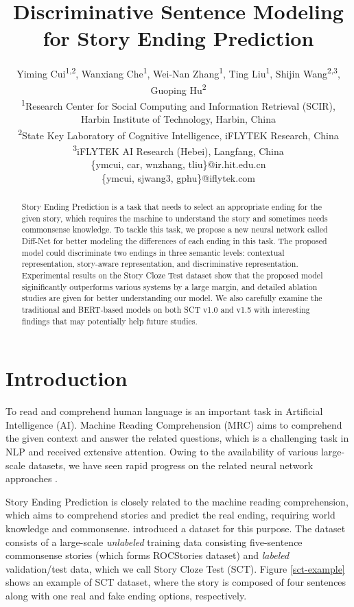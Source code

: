 \documentclass[letterpaper]{article} %
\title{Discriminative Sentence Modeling for Story Ending Prediction }
\author{Yiming Cui\textsuperscript{\rm 1,2}, Wanxiang Che\textsuperscript{\rm 1}, Wei-Nan Zhang\textsuperscript{\rm 1}, Ting Liu\textsuperscript{\rm 1}, Shijin Wang\textsuperscript{\rm 2,3}, Guoping Hu\textsuperscript{\rm 2} \\ %
\textsuperscript{\rm 1}Research Center for Social Computing and Information Retrieval (SCIR), Harbin Institute of Technology, Harbin, China\\ %
\textsuperscript{\rm 2}State Key Laboratory of Cognitive Intelligence, iFLYTEK Research, China\\
\textsuperscript{\rm 3}iFLYTEK AI Research (Hebei), Langfang, China\\
\{ymcui, car, wnzhang, tliu\}@ir.hit.edu.cn \\%
\{ymcui, sjwang3, gphu\}@iflytek.com
}
\begin{document}
\maketitle

\begin{abstract}
Story Ending Prediction is a task that needs to select an appropriate ending for the given story, which requires the machine to understand the story and sometimes needs commonsense knowledge.
To tackle this task, we propose a new neural network called Diff-Net for better modeling the differences of each ending in this task. 
The proposed model could discriminate two endings in three semantic levels: contextual representation, story-aware representation, and discriminative representation. 
Experimental results on the Story Cloze Test dataset show that the proposed model siginificantly outperforms various systems by a large margin, and detailed ablation studies are given for better understanding our model. 
We also carefully examine the traditional and BERT-based models on both SCT v1.0 and v1.5 with interesting findings that may potentially help future studies.
\end{abstract}


\section{Introduction}\label{introduction}
To read and comprehend human language is an important task in Artificial Intelligence (AI).
Machine Reading Comprehension (MRC) aims to comprehend the given context and answer the related questions, which is a challenging task in NLP and received extensive attention.
Owing to the availability of various large-scale datasets, we have seen rapid progress on the related neural network approaches \cite{hermann-etal-2015,kadlec-etal-2016,cui-etal-2016,wang-and-jiang-2016,seo-etal-2016,cui-acl2017-aoa,dhingra-etal-2017}. 

Story Ending Prediction is closely related to the machine reading comprehension, which aims to comprehend stories and predict the real ending, requiring world knowledge and commonsense. 
\citeauthor{mostafazadeh-etal-2016}  introduced a dataset for this purpose. 
The dataset consists of a large-scale {\em unlabeled} training data consisting five-sentence commonsense stories (which forms ROCStories dataset) and {\em labeled} validation/test data, which we call Story Cloze Test (SCT). 
Figure \ref{sct-example} shows an example of SCT dataset, where the story is composed of four sentences along with one real and fake ending options, respectively.
\end{document}
